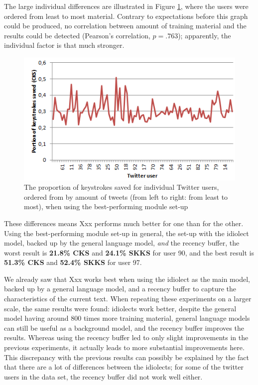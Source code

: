 \documentclass[11pt]{article}
\begin{document}
The large individual differences are illustrated in Figure \ref{chaos}, where the users were ordered from least to most material. Contrary to expectations before this graph could be produced, no correlation between amount of training material and the results could be detected (Pearson's correlation, $p = .763$); apparently, the individual factor is that much stronger.

\begin{figure}[H] \centering
\includegraphics[scale=1]{twitter_chaos}
\caption{The proportion of keystrokes saved for individual Twitter users, ordered from by amount of tweets (from left to right: from least to most), when using the best-performing module set-up}
\label{chaos}
\end{figure} 

These differences means Xxx performs much better for one than for the other. Using the best-performing module set-up in general, the set-up with the idiolect model, backed up by the general language model, \emph{and} the recency buffer, the worst result is \textbf{21.8\% CKS} and \textbf{24.1\% SKKS} for user 90, and the best result is \textbf{51.3\% CKS} and \textbf{52.4\% SKKS} for user 97.

We already saw that Xxx works best when using the idiolect as the main model, backed up by a general language model, and a recency buffer to capture the characteristics of the current text. When repeating these experiments on a larger scale, the same results were found: idiolects work better, despite the general model having around 800 times more training material, general language models can still be useful as a background model, and the recency buffer improves the results. Whereas using the recency buffer led to only slight improvements in the previous experiments, it actually leads to more substantial improvements here. This discrepancy with the previous results can possibly be explained by the fact that there are a lot of differences between the idiolects; for some of the twitter users in the data set, the recency buffer did not work well either.
\end{document}

